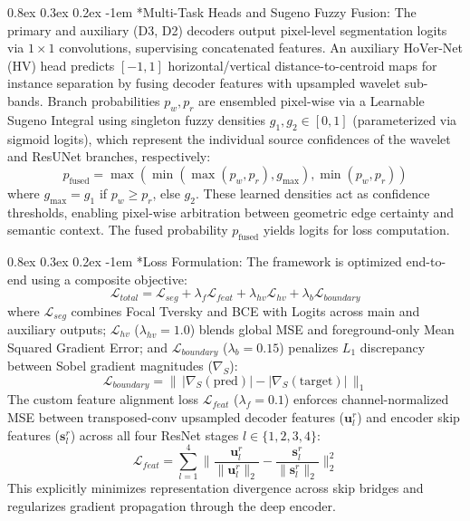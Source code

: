 \documentclass{article}
\makeatletter
\renewcommand\paragraph{\@startsection{paragraph}{4}{0pt}%
  {0.8ex \@plus 0.3ex \@minus 0.2ex}%
  {-1em}%
  {\normalsize\bfseries}}
\makeatother
\begin{document}
\paragraph*{Multi-Task Heads and Sugeno Fuzzy Fusion:}
The primary and auxiliary (D3, D2) decoders output pixel-level segmentation logits via $1\times1$ convolutions, supervising concatenated features. An auxiliary HoVer-Net (HV) head predicts $[-1,1]$ horizontal/vertical distance-to-centroid maps for instance separation by fusing decoder features with upsampled wavelet sub-bands. Branch probabilities $p_w, p_r$ are ensembled pixel-wise via a Learnable Sugeno Integral using singleton fuzzy densities $g_1, g_2 \in [0, 1]$ (parameterized via sigmoid logits), which represent the individual source confidences of the wavelet and ResUNet branches, respectively:
\begin{equation}
    p_{\text{fused}} =
    \max \left(
        \min\left(\max(p_w, p_r), g_{\max}\right),
        \min(p_w, p_r)
    \right)
\end{equation}
where $g_{\max} = g_1$ if $p_w \ge p_r$, else $g_2$. These learned densities act as confidence thresholds, enabling pixel-wise arbitration between geometric edge certainty and semantic context. The fused probability $p_{\text{fused}}$ yields logits for loss computation.

\paragraph*{Loss Formulation:}
The framework is optimized end-to-end using a composite objective:
\begin{equation}
    \mathcal{L}_{total} = \mathcal{L}_{seg} + \lambda_f \mathcal{L}_{feat} + \lambda_{hv}\mathcal{L}_{hv} + \lambda_{b}\mathcal{L}_{boundary}
\end{equation}
where $\mathcal{L}_{seg}$ combines Focal Tversky and BCE with Logits across main and auxiliary outputs; $\mathcal{L}_{hv}$ ($\lambda_{hv} = 1.0$) blends global MSE and foreground-only Mean Squared Gradient Error; and $\mathcal{L}_{boundary}$ ($\lambda_b = 0.15$) penalizes $L_1$ discrepancy between Sobel gradient magnitudes ($\nabla_{S}$):
\begin{equation}
    \mathcal{L}_{boundary} = \| \, |\nabla_{S}(\text{pred})| - |\nabla_{S}(\text{target})| \, \|_1
\end{equation}
The custom feature alignment loss $\mathcal{L}_{feat}$ ($\lambda_f = 0.1$) enforces channel-normalized MSE between transposed-conv upsampled decoder features ($\mathbf{u}_l^r$) and encoder skip features ($\mathbf{s}_l^r$) across all four ResNet stages $l \in \{1, 2, 3, 4\}$:
\begin{equation}
    \mathcal{L}_{feat} = \sum_{l=1}^{4} \Big\| \frac{\mathbf{u}_l^r}{\|\mathbf{u}_l^r\|_2} - \frac{\mathbf{s}_l^r}{\|\mathbf{s}_l^r\|_2} \Big\|_2^2
\end{equation}
This explicitly minimizes representation divergence across skip bridges and regularizes gradient propagation through the deep encoder.
\end{document}
